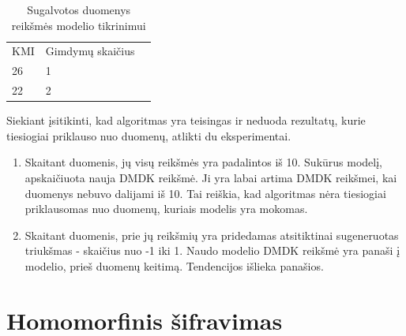 \documentclass{VUMIFInfBakalaurinis}
\begin{document}
\begin{table}[h]
\centering
\begin{tabular}{|l|l|l|}
\cline{1-2}
KMI & Gimdymų skaičius \\\cline{1-2}
26      & 1 \\\cline{1-2}
22       & 2 \\\cline{1-2}
\end{tabular}
\caption{Sugalvotos duomenys reikšmės modelio tikrinimui}
\label{tab:my-table}
\end{table}

\par Siekiant įsitikinti, kad algoritmas yra teisingas ir neduoda rezultatų, kurie tiesiogiai priklauso nuo duomenų, atlikti du eksperimentai.

\begin{enumerate}
    \item Skaitant duomenis, jų visų reikšmės yra padalintos iš 10. Sukūrus modelį, apskaičiuota nauja DMDK reikšmė. Ji yra labai artima DMDK reikšmei, kai duomenys nebuvo dalijami iš 10. Tai reiškia, kad algoritmas nėra tiesiogiai priklausomas nuo duomenų, kuriais modelis yra mokomas.
    \item Skaitant duomenis, prie jų reikšmių yra pridedamas atsitiktinai sugeneruotas triukšmas - skaičius nuo -1 iki 1. Naudo modelio DMDK reikšmė yra panaši į modelio, prieš duomenų keitimą. Tendencijos išlieka panašios.
\end{enumerate}

\section{Homomorfinis šifravimas}
\end{document}
